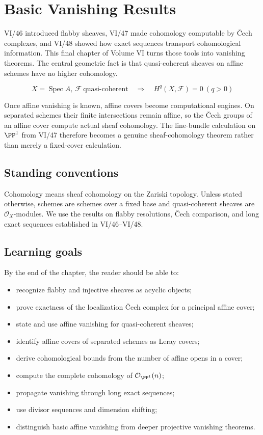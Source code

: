 \chapter{Basic Vanishing Results}
\label{ch:vi49-basic-vanishing-results}

VI/46 introduced flabby sheaves, VI/47 made cohomology computable by \v{C}ech complexes, and VI/48 showed how exact sequences transport cohomological information.  This final chapter of Volume VI turns those tools into vanishing theorems.  The central geometric fact is that quasi-coherent sheaves on affine schemes have no higher cohomology.

\[
\boxed{
X=\operatorname{Spec}A,\ \mathcal F\ \text{quasi-coherent}
\quad\Longrightarrow\quad
H^q(X,\mathcal F)=0\ (q>0)
}
\]

Once affine vanishing is known, affine covers become computational engines.  On separated schemes their finite intersections remain affine, so the \v{C}ech groups of an affine cover compute actual sheaf cohomology.  The line-bundle calculation on $\PP^1$ from VI/47 therefore becomes a genuine sheaf-cohomology theorem rather than merely a fixed-cover calculation.

\section*{Standing conventions}
Cohomology means sheaf cohomology on the Zariski topology.  Unless stated otherwise, schemes are schemes over a fixed base and quasi-coherent sheaves are $\mathcal O_X$-modules.  We use the results on flabby resolutions, \v{C}ech comparison, and long exact sequences established in VI/46--VI/48.

\section*{Learning goals}
By the end of the chapter, the reader should be able to:
\begin{itemize}
\item recognize flabby and injective sheaves as acyclic objects;
\item prove exactness of the localization \v{C}ech complex for a principal affine cover;
\item state and use affine vanishing for quasi-coherent sheaves;
\item identify affine covers of separated schemes as Leray covers;
\item derive cohomological bounds from the number of affine opens in a cover;
\item compute the complete cohomology of $\mathcal O_{\PP^1}(n)$;
\item propagate vanishing through long exact sequences;
\item use divisor sequences and dimension shifting;
\item distinguish basic affine vanishing from deeper projective vanishing theorems.
\end{itemize}

